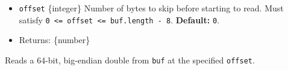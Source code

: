 \begin{itemize}
\tightlist
\item
  \texttt{offset} \{integer\} Number of bytes to skip before starting to
  read. Must satisfy
  \texttt{0\ \textless{}=\ offset\ \textless{}=\ buf.length\ -\ 8}.
  \textbf{Default:} \texttt{0}.
\item
  Returns: \{number\}
\end{itemize}

Reads a 64-bit, big-endian double from \texttt{buf} at the specified
\texttt{offset}.

\begin{Shaded}
\begin{Highlighting}[]
\NormalTok{ \{ }\NormalTok{ \} } \OperatorTok{;}

\OperatorTok{=} \NormalTok{([}\OperatorTok{,} \OperatorTok{,} \OperatorTok{,} \OperatorTok{,} \OperatorTok{,} \OperatorTok{,} \OperatorTok{,} \NormalTok{])}\OperatorTok{;}

\NormalTok{(}\NormalTok{))}\OperatorTok{;}
\end{Highlighting}
\end{Shaded}

\begin{Shaded}
\begin{Highlighting}[]
\NormalTok{ \{ }\NormalTok{ \} }\OperatorTok{=} \NormalTok{(}\NormalTok{)}\OperatorTok{;}

\OperatorTok{=} \NormalTok{([}\OperatorTok{,} \OperatorTok{,} \OperatorTok{,} \OperatorTok{,} \OperatorTok{,} \OperatorTok{,} \OperatorTok{,} \NormalTok{])}\OperatorTok{;}

\NormalTok{(}\NormalTok{))}\OperatorTok{;}
\end{Highlighting}
\end{Shaded}

